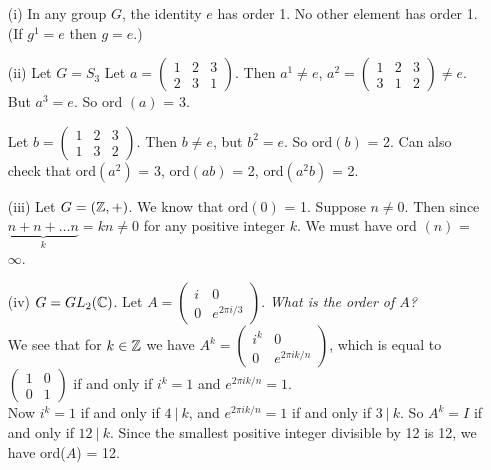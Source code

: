 \documentclass[twoside]{scrartcl}
\begin{document}
\begin{examples}\begin{enumerate}
 \item[(i)] In any group $G$, the identity $e$ has order 1. No other element has order 1. (If $g^1 = e$ then $g = e$.)
 
 \item[(ii)] Let $G = S_3$ Let $a  = \left(\begin{smallmatrix}
1 & 2 & 3 \\ 2 & 3 & 1	
\end{smallmatrix}\right)$. Then $a^1 \neq e$, $a^2 = \left(\begin{smallmatrix}
1 & 2 & 3 \\ 3 & 1 & 2 	
\end{smallmatrix}\right) \neq e$. But $a^3 = e$. So ord $(a)$ = 3.

 Let $b = \left(\begin{smallmatrix}
1 & 2 & 3 \\ 1 & 3 & 2	
\end{smallmatrix}\right).$ Then $b \neq e$, but $b^2 = e$. So ord$(b)$ = 2. Can also check that ord$(a^2)$ = 3, ord$(ab)$ = 2, ord$(a^2b)$ = 2.


\item[(iii)] Let $G = (\mathbb{Z},+)$. We know that ord$(0)$ = 1. Suppose $n \neq 0$. Then since $\underbrace{n + n + \dots n}_{k} = kn \neq 0$ for any positive integer $k$. We must have ord $(n)$ = $\infty$.
\item[(iv)] $G = GL_2(\mathbb{C})$. Let $A = \left(\begin{smallmatrix}
i & 0 \\ 0 & e^{2 \pi i/3} 	
\end{smallmatrix}\right)$. \emph{What is the order of $A$?}\\

We see that for $k \in \mathbb{Z}$ we have $A^k = \left(\begin{smallmatrix}
i^k & 0 \\ 0 & e^{2\pi ik/n}	
\end{smallmatrix}\right)
$, which is equal to $\left(\begin{smallmatrix}
1 & 0 \\ 0 & 1	
\end{smallmatrix}\right)$ if and only if $i^k = 1$ and $e^{2 \pi ik/n} = 1$.\\

 Now $i^k = 1$ if and only if $4 ~|~ k$, and $e^{2\pi ik/n} = 1$ if and only if $3 ~|~ k$. So $A^k = I$ if and only if $12 ~|~ k$. Since the smallest positive integer divisible by 12 is 12, we have ord($A$) = 12.
 \end{enumerate}
 \end{examples}\vspace*{10pt}
 
\end{document}
